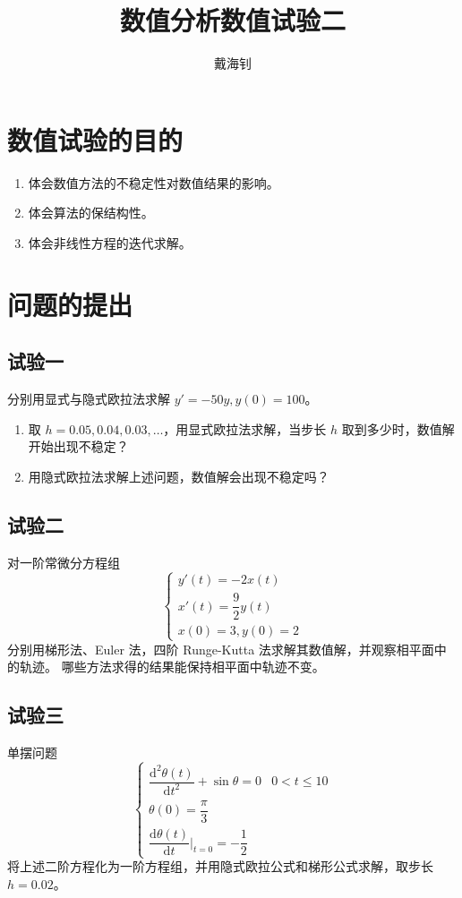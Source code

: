 \documentclass{article}
\title{数值分析数值试验二}
\author{戴海钊\quad 2019533084}
\begin{document}
\maketitle

\section{数值试验的目的}
\begin{enumerate}
    \item 体会数值方法的不稳定性对数值结果的影响。
    \item 体会算法的保结构性。
    \item 体会非线性方程的迭代求解。
\end{enumerate}

\section{问题的提出}
\subsection{试验一}
分别用显式与隐式欧拉法求解 $y'=-50y,y(0)=100$。
\begin{enumerate}
    \item 取 $h=0.05,0.04,0.03,\dots$，用显式欧拉法求解，当步长 $h$ 取到多少时，数值解开始出现不稳定？
    \item 用隐式欧拉法求解上述问题，数值解会出现不稳定吗？
\end{enumerate}

\subsection{试验二}
对一阶常微分方程组
\begin{equation}
    \begin{cases}
        y'(t)=-2x(t)\\
        x'(t)=\dfrac{9}{2}y(t)\\
        x(0)=3, y(0)=2
    \end{cases}
\end{equation}
分别用梯形法、Euler 法，四阶 Runge-Kutta 法求解其数值解，并观察相平面中的轨迹。
哪些方法求得的结果能保持相平面中轨迹不变。

\subsection{试验三}
单摆问题
\begin{equation}
    \begin{cases}
        \dfrac{\mathrm{d}^2\theta(t)}{\mathrm{d}t^2}+\sin\theta=0&0<t\le10\\
        \theta(0)=\dfrac{\pi}{3}\\
        \dfrac{\mathrm{d}\theta(t)}{\mathrm{d}t}\bigg|_{t = 0}=-\dfrac{1}{2}
    \end{cases}
\end{equation}
将上述二阶方程化为一阶方程组，并用隐式欧拉公式和梯形公式求解，取步长 $h=0.02$。
\end{document}
